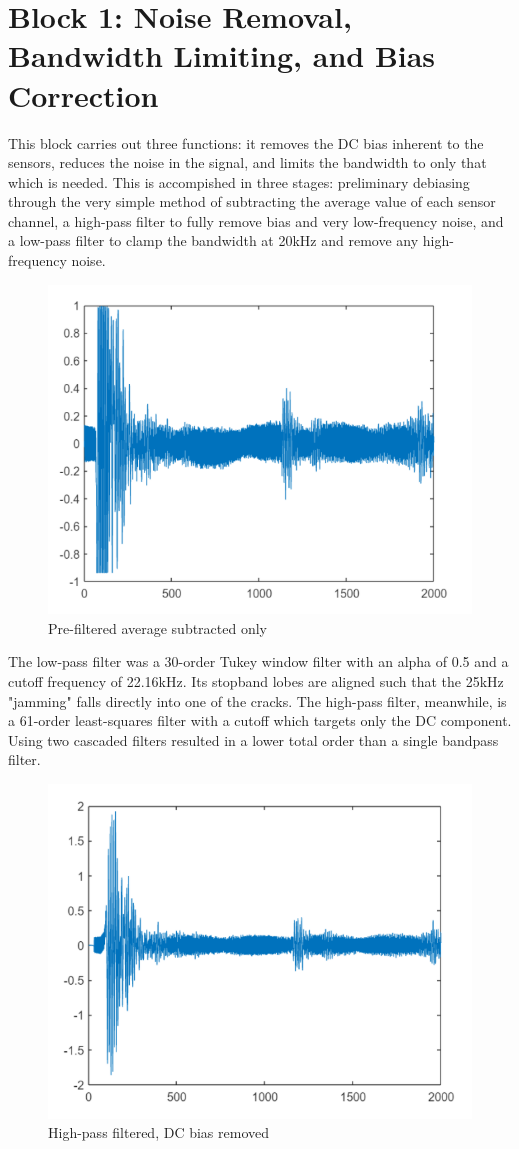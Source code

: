 
\section{Block 1: Noise Removal, Bandwidth Limiting, and Bias Correction}

This block carries out three functions: it removes the DC bias inherent to the sensors, reduces the noise
 in the signal, and limits the bandwidth to only that which is needed. This is accompished in three stages:
 preliminary debiasing through the very simple method of subtracting the average value of each sensor channel,
 a high-pass filter to fully remove bias and very low-frequency noise, and a low-pass filter to clamp the
 bandwidth at 20kHz and remove any high-frequency noise. 

\begin{figure}[H]
    \centering
    \includegraphics[width=0.5\linewidth]{figures/prefiltered.PNG}
    \caption{Pre-filtered average subtracted only}
\end{figure}
 
The low-pass filter was a 30-order Tukey window filter
with an alpha of 0.5 and a cutoff frequency of 22.16kHz. Its stopband lobes are aligned such that the 25kHz
"jamming" falls directly into one of the cracks. The high-pass filter, meanwhile, is a 61-order least-squares
 filter with a cutoff which targets only the DC component. Using two cascaded filters resulted in a lower total
 order than a single bandpass filter.

\begin{figure}[H]
    \centering
    \includegraphics[width=0.5\linewidth]{figures/debiased.PNG}
    \caption{High-pass filtered, DC bias removed}
\end{figure}

